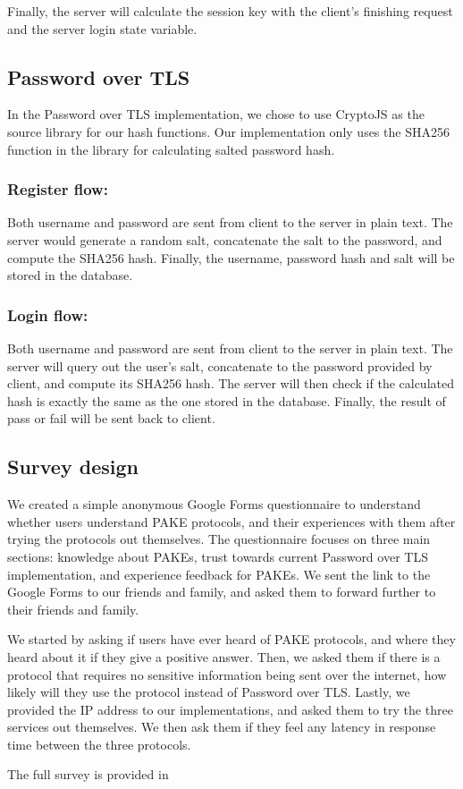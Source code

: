 Finally, the server will calculate the session key with the client's finishing request and the server login state variable.




\subsection{Password over TLS}
In the Password over TLS implementation, we chose to use CryptoJS as the source library for our hash functions.
Our implementation only uses the SHA256 function in the library for calculating salted password hash.

\subsubsection{Register flow:}
Both username and password are sent from client to the server in plain text.
The server would generate a random salt, concatenate the salt to the password, and compute the SHA256 hash.
Finally, the username, password hash and salt will be stored in the database.

\subsubsection{Login flow:}
Both username and password are sent from client to the server in plain text.
The server will query out the user's salt, concatenate to the password provided by client, and compute its SHA256 hash.
The server will then check if the calculated hash is exactly the same as the one stored in the database.
Finally, the result of pass or fail will be sent back to client.

\subsection{Survey design}

We created a simple anonymous Google Forms questionnaire to understand whether users understand PAKE protocols, and their experiences with them after trying the protocols out themselves.
The questionnaire focuses on three main sections: knowledge about PAKEs, trust towards current Password over TLS implementation, and experience feedback for PAKEs.
We sent the link to the Google Forms to our friends and family, and asked them to forward further to their friends and family.


We started by asking if users have ever heard of PAKE protocols, and where they heard about it if they give a positive answer.
Then, we asked them if there is a protocol that requires no sensitive information being sent over the internet, how likely will they use the protocol instead of Password over TLS.
Lastly, we provided the IP address to our implementations, and asked them to try the three services out themselves.
We then ask them if they feel any latency in response time between the three protocols.

The full survey is provided in ~
